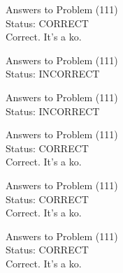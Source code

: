 \documentclass[11pt]{article}
\begin{document}
\begin{minipage}[t]{0.5\textwidth}
  {\centering
  
  Answers to Problem (111)\\
  Status: CORRECT\\
  Correct. It's a ko.\\
  }
\end{minipage}
\begin{minipage}[t]{0.5\textwidth}
  {\centering
  
  Answers to Problem (111)\\
  Status: INCORRECT\\
  
  }
\end{minipage}
\begin{minipage}[t]{0.5\textwidth}
  {\centering
  
  Answers to Problem (111)\\
  Status: INCORRECT\\
  
  }
\end{minipage}
\begin{minipage}[t]{0.5\textwidth}
  {\centering
  
  Answers to Problem (111)\\
  Status: CORRECT\\
  Correct. It's a ko.\\
  }
\end{minipage}
\begin{minipage}[t]{0.5\textwidth}
  {\centering
  
  Answers to Problem (111)\\
  Status: CORRECT\\
  Correct. It's a ko.\\
  }
\end{minipage}
\begin{minipage}[t]{0.5\textwidth}
  {\centering
  
  Answers to Problem (111)\\
  Status: CORRECT\\
  Correct. It's a ko.\\
  }
\end{minipage}
\end{document}
